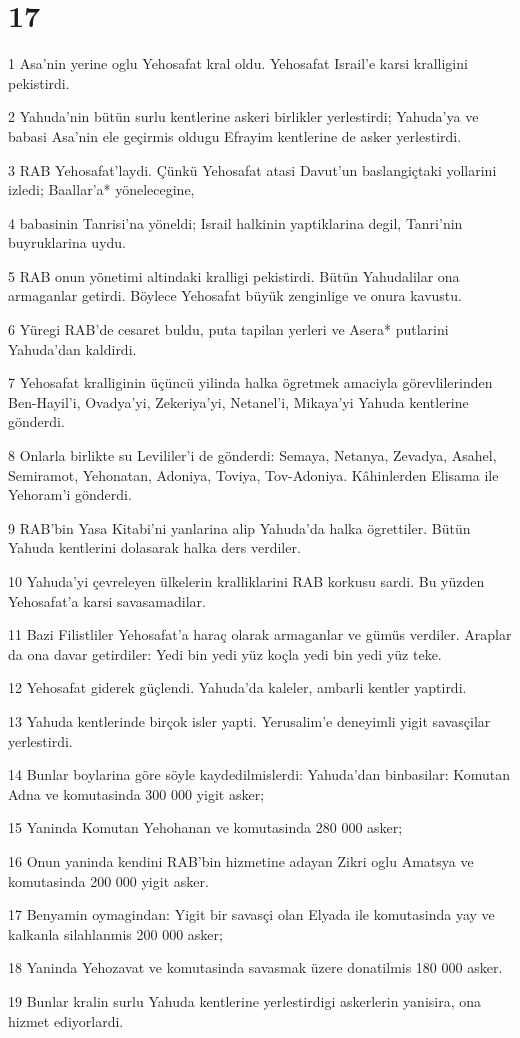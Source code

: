 \chapter{17}

\par 1 Asa'nin yerine oglu Yehosafat kral oldu. Yehosafat Israil'e karsi kralligini pekistirdi.
\par 2 Yahuda'nin bütün surlu kentlerine askeri birlikler yerlestirdi; Yahuda'ya ve babasi Asa'nin ele geçirmis oldugu Efrayim kentlerine de asker yerlestirdi.
\par 3 RAB Yehosafat'laydi. Çünkü Yehosafat atasi Davut'un baslangiçtaki yollarini izledi; Baallar'a* yönelecegine,
\par 4 babasinin Tanrisi'na yöneldi; Israil halkinin yaptiklarina degil, Tanri'nin buyruklarina uydu.
\par 5 RAB onun yönetimi altindaki kralligi pekistirdi. Bütün Yahudalilar ona armaganlar getirdi. Böylece Yehosafat büyük zenginlige ve onura kavustu.
\par 6 Yüregi RAB'de cesaret buldu, puta tapilan yerleri ve Asera* putlarini Yahuda'dan kaldirdi.
\par 7 Yehosafat kralliginin üçüncü yilinda halka ögretmek amaciyla görevlilerinden Ben-Hayil'i, Ovadya'yi, Zekeriya'yi, Netanel'i, Mikaya'yi Yahuda kentlerine gönderdi.
\par 8 Onlarla birlikte su Levililer'i de gönderdi: Semaya, Netanya, Zevadya, Asahel, Semiramot, Yehonatan, Adoniya, Toviya, Tov-Adoniya. Kâhinlerden Elisama ile Yehoram'i gönderdi.
\par 9 RAB'bin Yasa Kitabi'ni yanlarina alip Yahuda'da halka ögrettiler. Bütün Yahuda kentlerini dolasarak halka ders verdiler.
\par 10 Yahuda'yi çevreleyen ülkelerin kralliklarini RAB korkusu sardi. Bu yüzden Yehosafat'a karsi savasamadilar.
\par 11 Bazi Filistliler Yehosafat'a haraç olarak armaganlar ve gümüs verdiler. Araplar da ona davar getirdiler: Yedi bin yedi yüz koçla yedi bin yedi yüz teke.
\par 12 Yehosafat giderek güçlendi. Yahuda'da kaleler, ambarli kentler yaptirdi.
\par 13 Yahuda kentlerinde birçok isler yapti. Yerusalim'e deneyimli yigit savasçilar yerlestirdi.
\par 14 Bunlar boylarina göre söyle kaydedilmislerdi: Yahuda'dan binbasilar: Komutan Adna ve komutasinda 300 000 yigit asker;
\par 15 Yaninda Komutan Yehohanan ve komutasinda 280 000 asker;
\par 16 Onun yaninda kendini RAB'bin hizmetine adayan Zikri oglu Amatsya ve komutasinda 200 000 yigit asker.
\par 17 Benyamin oymagindan: Yigit bir savasçi olan Elyada ile komutasinda yay ve kalkanla silahlanmis 200 000 asker;
\par 18 Yaninda Yehozavat ve komutasinda savasmak üzere donatilmis 180 000 asker.
\par 19 Bunlar kralin surlu Yahuda kentlerine yerlestirdigi askerlerin yanisira, ona hizmet ediyorlardi.

